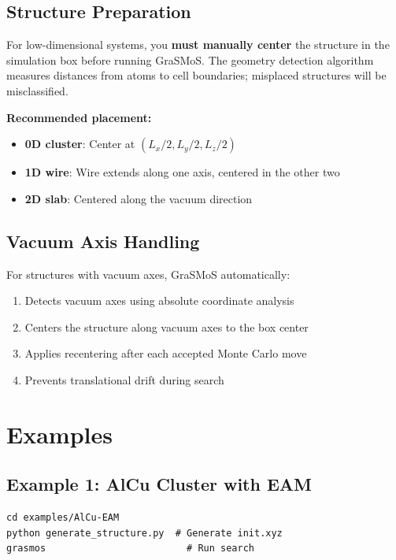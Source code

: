 \documentclass[11pt,a4paper]{article}
\begin{document}
\subsection{Structure Preparation}
\begin{tcolorbox}[colback=red!5,colframe=red!50,title=IMPORTANT: Structure Centering]
For low-dimensional systems, you \textbf{must manually center} the structure in the simulation box before running GraSMoS. The geometry detection algorithm measures distances from atoms to cell boundaries; misplaced structures will be misclassified.

\textbf{Recommended placement:}
\begin{itemize}
    \item \textbf{0D cluster}: Center at $(L_x/2, L_y/2, L_z/2)$
    \item \textbf{1D wire}: Wire extends along one axis, centered in the other two
    \item \textbf{2D slab}: Centered along the vacuum direction
\end{itemize}
\end{tcolorbox}

\subsection{Vacuum Axis Handling}
For structures with vacuum axes, GraSMoS automatically:
\begin{enumerate}
    \item Detects vacuum axes using absolute coordinate analysis
    \item Centers the structure along vacuum axes to the box center
    \item Applies recentering after each accepted Monte Carlo move
    \item Prevents translational drift during search
\end{enumerate}

\section{Examples}

\subsection{Example 1: AlCu Cluster with EAM}
\begin{lstlisting}[style=bashStyle]
cd examples/AlCu-EAM
python generate_structure.py  # Generate init.xyz
grasmos                         # Run search
\end{lstlisting}
\end{document}

